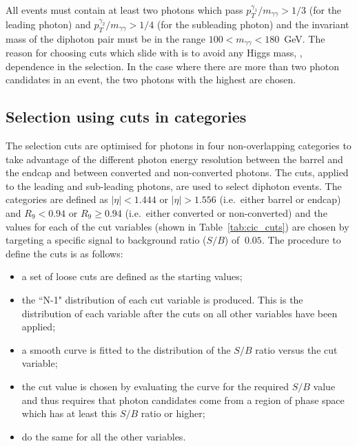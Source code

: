 All events must contain at least two photons which pass $p_{T}^{\gamma_{1}}/m_{\gamma\gamma}>1/3$ (for the leading photon) and $p_{T}^{\gamma_{2}}/m_{\gamma\gamma}>1/4$ (for the subleading photon) and the invariant mass of the diphoton pair must be in the range $100<m_{\gamma\gamma}<180$~GeV. The reason for choosing \pT cuts which slide with \mgg is to avoid any Higgs mass, \mH, dependence in the selection. In the case where there are more than two photon candidates in an event, the two photons with the highest \pT are chosen. 

\subsection{Selection using cuts in categories}
\label{sec:cic}

The selection cuts are optimised for photons in four non-overlapping categories to take advantage of the different photon energy resolution between the barrel and the endcap and between converted and non-converted photons. The cuts, applied to the leading and sub-leading photons, are used to select diphoton events. The categories are defined as $|\eta|<1.444$ or $|\eta|>1.556$ (i.e.\ either barrel or endcap) and $R_{9}<0.94$ or $R_{9}\geq 0.94$ (i.e.\ either converted or non-converted) and the values for each of the cut variables (shown in Table~\ref{tab:cic_cuts}) are chosen by targeting a specific signal to background ratio ($S/B$) of $~0.05$. The procedure to define the cuts is as follows:

\begin{itemize}
  \item a set of loose cuts are defined as the starting values;
  \item the ``N-1" distribution of each cut variable is produced. This is the distribution of each variable after the cuts on all other variables have been applied;
  \item a smooth curve is fitted to the distribution of the $S/B$ ratio versus the cut variable;
  \item the cut value is chosen by evaluating the curve for the required $S/B$ value and thus requires that photon candidates come from a region of phase space which has at least this $S/B$ ratio or higher;
  \item do the same for all the other variables.
\end{itemize}

